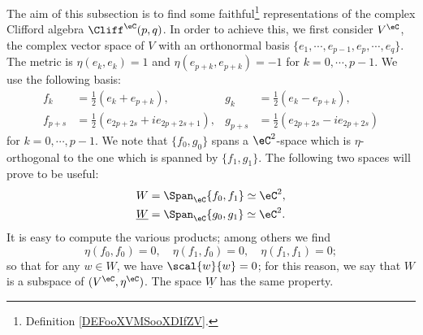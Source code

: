 The aim of this subsection is to find some faithful\footnote{Definition \ref{DEFooXVMSooXDIfZV}.} representations of the complex Clifford algebra $\Cliff^{\eC}(p,q)$. In order to achieve this, we first consider $V^{\eC}$, the complex vector space of $V$ with an orthonormal basis $\{ e_1,\cdots,e_{p-1},e_p,\cdots,e_q  \}$. The metric is $\eta(e_k,e_k)=1$ and $\eta(e_{p+k},e_{p+k})=-1$ for $k=0,\cdots,p-1$. We use the following basis:
\begin{align}
f_k&=\frac{1}{2}(e_k+e_{p+k}),& g_k&=\frac{1}{2}(e_k-e_{p+k}),\\
 f_{p+s}&=\frac{1}{2}(e_{2p+2s}+ie_{2p+2s+1}),& g_{p+s}&=\frac{1}{2}(e_{2p+2s}-ie_{2p+2s})
\end{align}
for $k=0,\cdots,p-1$.
We note that $\{f_0,g_0\}$ spans a $\eC^2$-space which is $\eta$-orthogonal to the one which is spanned by $\{f_1,g_1\}$. The following two  spaces will prove to be useful:
\begin{subequations}
\begin{align}
  W           &=\Span_{\eC}\{f_0,f_1\}\simeq\eC^2,\\
 \underline{W}&=\Span_{\eC}\{g_0,g_1\}\simeq\eC^2.
\end{align}
\end{subequations}
It is easy to compute the various products; among others we find
\begin{equation}
 \eta(f_0,f_0)=0,\quad
 \eta(f_1,f_0)=0,\quad
  \eta(f_1,f_1)=0;
\end{equation}
so that for any $w\in W$, we have $\scal{w}{w}=0$; for this reason, we say that $W$ is a  subspace of $(V^{\eC},\eta^{\eC})$. The space $\underline{W}$ has the same property.

